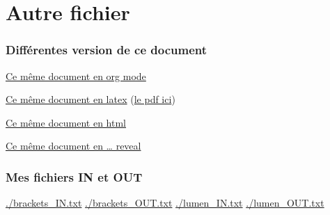 \documentclass[11pt]{article}
\begin{document}
\section{Autre fichier}
\label{sec:org0ea0acc}

\subsubsection{Différentes version de ce document}
\label{sec:orgceb6ee0}

\href{./compte\_rendu.org}{Ce même document en org mode}

\href{./compte\_rendu.tex}{Ce même document en latex} 
(\href{./compte\_rendu.pdf}{le pdf ici})

\href{./compte\_rendu.html}{Ce même document en html}

\href{./compte\_rendu\_reveal.html}{Ce même document en \ldots{} reveal}

\subsubsection{Mes fichiers IN et OUT}
\label{sec:orgda27a11}

\url{./brackets\_IN.txt}
\url{./brackets\_OUT.txt}
\url{./lumen\_IN.txt} 
\url{./lumen\_OUT.txt}
\end{document}
